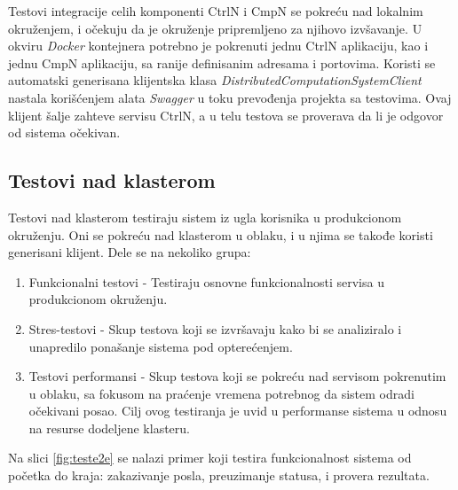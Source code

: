 \documentclass[12pt,oneside]{memoir}
\begin{document}
Testovi integracije celih komponenti CtrlN i CmpN se pokreću nad lokalnim okruženjem, i očekuju da je okruženje pripremljeno za njihovo izvšavanje. U okviru \emph{Docker} kontejnera potrebno je pokrenuti jednu CtrlN aplikaciju, kao i jednu CmpN aplikaciju, sa ranije definisanim adresama i portovima. Koristi se automatski generisana klijentska klasa \emph{DistributedComputationSystemClient} nastala korišćenjem alata \emph{Swagger} u toku prevođenja projekta sa testovima. Ovaj klijent šalje zahteve servisu CtrlN, a u telu testova se proverava da li je odgovor od sistema očekivan.

\subsection{Testovi nad klasterom}

Testovi nad klasterom testiraju sistem iz ugla korisnika u produkcionom okruženju. Oni se pokreću nad klasterom u oblaku, i u njima se takođe koristi generisani klijent. Dele se na nekoliko grupa:
\begin{enumerate}
\item Funkcionalni testovi - Testiraju osnovne funkcionalnosti servisa u produkcionom okruženju.
\item Stres-testovi - Skup testova koji se izvršavaju kako bi se analiziralo i unapredilo ponašanje sistema pod opterećenjem. 
\item Testovi performansi - Skup testova koji se pokreću nad servisom pokrenutim u oblaku, sa fokusom na praćenje vremena potrebnog da sistem odradi očekivani posao. Cilj ovog testiranja je uvid u performanse sistema u odnosu na resurse dodeljene klasteru.
\end{enumerate}

Na slici \ref{fig:teste2e} se nalazi primer koji testira funkcionalnost sistema od početka do kraja: zakazivanje posla, preuzimanje statusa, i provera rezultata.
\end{document}
